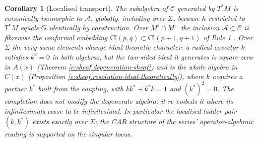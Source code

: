 \documentclass[11pt]{article}
\newtheorem{corollary}[theorem]{Corollary}
\theoremstyle{definition}
\theoremstyle{plain}
\providecommand{\Cl}{}\renewcommand{\Cl}{\mathrm{Cl}}
\providecommand{\Mo}{}\renewcommand{\Mo}{M^{\circ}}
\providecommand{\Mp}{}\renewcommand{\Mp}{M^{+}}
\providecommand{\Sig}{}\renewcommand{\Sig}{\Sigma}
\providecommand{\shA}{}\renewcommand{\shA}{\mathcal{A}}
\providecommand{\shC}{}\renewcommand{\shC}{\mathcal{C}}
\begin{document}
\begin{corollary}[Localised transport]\label{c:sheaf.localised-transport}
The subalgebra of $\shC$ generated by $T^*M$ is canonically isomorphic to $\shA$, globally, including over $\Sig$, because $h$ restricted to $T^*M$ equals $G$ identically by construction. Over $\Mo \cap \Mp$ the inclusion $\shA \subset \shC$ is fibrewise the conformal embedding $\Cl(p,q) \subset \Cl(p{+}1,q{+}1)$ of Rule 1 \cite{ButlerT1}. Over $\Sig$ the very same elements change ideal-theoretic character: a radical covector $k$ satisfies $k^2 = 0$ in both algebras, but the two-sided ideal it generates is square-zero in $A(x)$ (Theorem \ref{c:sheaf.degeneration-sheaf}) and is the whole algebra in $C(x)$ (Proposition \ref{c:sheaf.resolution-ideal-theoretically}), where $k$ acquires a partner $k^*$ built from the coupling, with $kk^* + k^*k = 1$ and $(k^*)^2 = 0$. The completion does not modify the degenerate algebra; it re-embeds it where its infinitesimals cease to be infinitesimal. In particular the localised ladder pair $(k, k^*)$ exists exactly over $\Sig$: the CAR structure of the series' operator-algebraic reading is supported on the singular locus.
\end{corollary}
\end{document}
